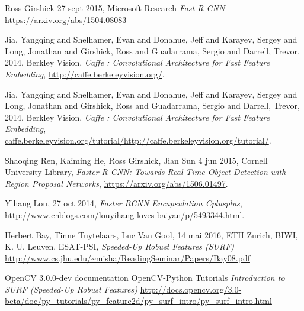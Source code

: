 \begin{thebibliography}{9}
  Ross Girshick
  27 sept 2015, 
  Microsoft Research
  \emph{Fast R-CNN}
  \url{https://arxiv.org/abs/1504.08083}
  
  Jia, Yangqing and Shelhamer, Evan and Donahue, Jeff and Karayev, Sergey and Long, Jonathan and Girshick, Ross and Guadarrama, Sergio and Darrell, Trevor,
  2014,
  Berkley Vision,
  \emph{Caffe : Convolutional Architecture for Fast Feature Embedding},
  \url{http://caffe.berkeleyvision.org/}.

  Jia, Yangqing and Shelhamer, Evan and Donahue, Jeff and Karayev, Sergey and Long, Jonathan and Girshick, Ross and Guadarrama, Sergio and Darrell, Trevor,
  2014,
  Berkley Vision,
  \emph{Caffe : Convolutional Architecture for Fast Feature Embedding},
  \url{caffe.berkeleyvision.org/tutorial/http://caffe.berkeleyvision.org/tutorial/}.

  Shaoqing Ren, Kaiming He, Ross Girshick, Jian Sun
  4 jun 2015,
  Cornell University Library,
  \emph{Faster R-CNN: Towards Real-Time Object Detection with Region Proposal Networks},
  \url{https://arxiv.org/abs/1506.01497}.
  

  Ylhang Lou,
  27 oct 2014,
  \emph{Faster RCNN Encapsulation Cplusplus},
  \url{http://www.cnblogs.com/louyihang-loves-baiyan/p/5493344.html}.  
  
  Herbert Bay, Tinne Tuytelaars, Luc Van Gool, 
  14 mai 2016,
  ETH Zurich, BIWI,
  K. U. Leuven, ESAT-PSI,
  \emph{Speeded-Up Robust Features (SURF)}
  \url{http://www.cs.jhu.edu/~misha/ReadingSeminar/Papers/Bay08.pdf}
  
  OpenCV 3.0.0-dev documentation
  OpenCV-Python Tutorials
  \emph{Introduction to SURF (Speeded-Up Robust Features)}
  \url{http://docs.opencv.org/3.0-beta/doc/py_tutorials/py_feature2d/py_surf_intro/py_surf_intro.html}
  
\end{thebibliography}